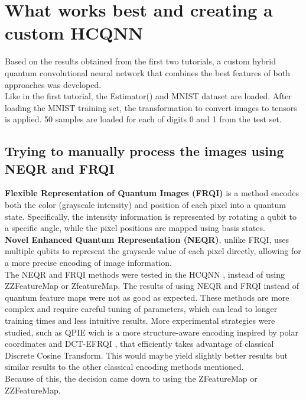 \documentclass[conference]{IEEEtran}
\begin{document}
\section*{\fontsize{16}{20}\selectfont What works best and creating a custom HCQNN}
\noindent
Based on the results obtained from the first two tutorials, a custom hybrid quantum convolutional neural network that combines the best features of both approaches was developed.\\
Like in the first tutorial, the Estimator() and MNIST dataset are loaded.
After loading the MNIST training set, the transformation to convert images to tensors is applied.
50 samples are loaded for each of digits 0 and 1 from the test set.

\subsection*{\fontsize{12}{16}\selectfont Trying to manually process the images using NEQR and FRQI}
\label {sec:NEQR_FRQI}
\noindent
\textbf{Flexible Representation of Quantum Images (FRQI)} is a method encodes both the color (grayscale intensity) and position of each pixel into a quantum state. Specifically, the intensity information is represented by rotating a qubit to a specific angle, while the pixel positions are mapped using basis states.\\


\noindent
\textbf{Novel Enhanced Quantum Representation (NEQR)}, unlike FRQI, uses multiple qubits to represent the grayscale value of each pixel directly, allowing for a more precise encoding of image information.\\


\noindent
The NEQR and FRQI methods were tested in the HCQNN \cite{qiskit_quantum_image_processing_medium} \cite{qiskit_textbook_frqi_neqr}, instead of using ZZFeatureMap or ZfeatureMap.
The results of using NEQR and FRQI instead of quantum feature maps were not as good as expected.
These methods are more complex and require careful tuning of parameters, which can lead to longer training times and less intuitive results.
More experimental strategies were studied, such as QPIE \cite{https://doi.org/10.1038/s41598-023-30575-2www.nature.com/scientificreports} wich is a more structure-aware encoding inspired by polar coordinates and DCT-EFRQI \cite{arXiv:2203.01831v1}, that efficiently takes advantage of classical Discrete Cosine Transform. This would maybe yield slightly better results but similar results to the other classical encoding methods mentioned.\\
Because of this, the decision came down to using the ZFeatureMap or ZZFeatureMap.\\
\end{document}
